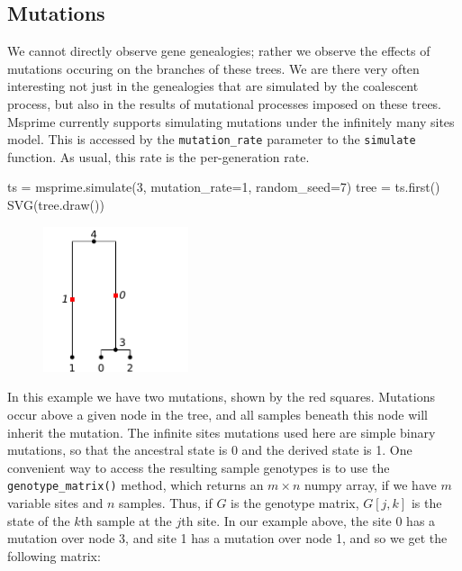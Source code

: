 \documentclass[graybox]{svmult}
\newcommand{\includenbimage}[1]{\begin{center}\texttt{[image: \#1]}\end{center}}
\begin{document}
    \subsection{Mutations}\label{mutations}

We cannot directly observe gene genealogies; rather we observe the
effects of mutations occuring on the branches of these trees. We are
there very often interesting not just in the genealogies that are
simulated by the coalescent process, but also in the results of
mutational processes imposed on these trees. Msprime currently supports
simulating mutations under the infinitely many sites model. This is
accessed by the \texttt{mutation\_rate} parameter to the
\texttt{simulate} function. As usual, this rate is the per-generation
rate.

\begin{pythoncode}
ts = msprime.simulate(3, mutation_rate=1, random_seed=7)
tree = ts.first()
SVG(tree.draw())
\end{pythoncode}

\begin{figure}
  \begin{center}
    \includegraphics[width=0.38\textwidth]{images/simulations_19_0}
  \end{center}
\end{figure}
    In this example we have two mutations, shown by the red squares.
Mutations occur above a given node in the tree, and all samples beneath
this node will inherit the mutation. The infinite sites mutations used
here are simple binary mutations, so that the ancestral state is 0 and
the derived state is 1. One convenient way to access the resulting
sample genotypes is to use the \texttt{genotype\_matrix()} method, which
returns an \(m \times n\) numpy array, if we have \(m\) variable sites
and \(n\) samples. Thus, if \(G\) is the genotype matrix, \(G[j, k]\) is
the state of the \(k\)th sample at the \(j\)th site. In our example
above, the site 0 has a mutation over node 3, and site 1 has a mutation
over node 1, and so we get the following matrix:
\end{document}
